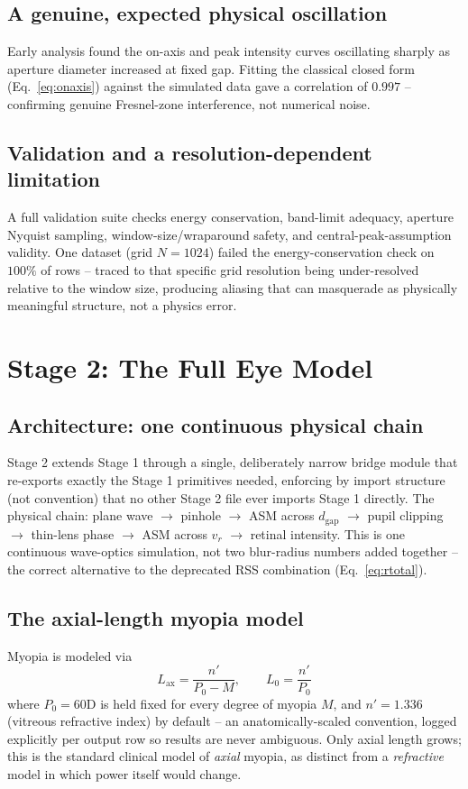 \documentclass[11pt]{report}
\newcommand{\dgap}{d_{\text{gap}}}
\newcommand{\vr}{v_r}
\begin{document}
\section{A genuine, expected physical oscillation}
\label{sec:oscillation}
Early analysis found the on-axis and peak intensity curves oscillating sharply as aperture diameter increased at fixed gap. Fitting the classical closed form (Eq.~\ref{eq:onaxis}) against the simulated data gave a correlation of $0.997$ -- confirming genuine Fresnel-zone interference, not numerical noise.

\section{Validation and a resolution-dependent limitation}
A full validation suite checks energy conservation, band-limit adequacy, aperture Nyquist sampling, window-size/wraparound safety, and central-peak-assumption validity. One dataset (grid $N=1024$) failed the energy-conservation check on $100\%$ of rows -- traced to that specific grid resolution being under-resolved relative to the window size, producing aliasing that can masquerade as physically meaningful structure, not a physics error.

\chapter{Stage 2: The Full Eye Model}
\label{ch:stage2}

\section{Architecture: one continuous physical chain}
Stage 2 extends Stage 1 through a single, deliberately narrow bridge module that re-exports exactly the Stage 1 primitives needed, enforcing by import structure (not convention) that no other Stage 2 file ever imports Stage 1 directly. The physical chain: plane wave $\to$ pinhole $\to$ ASM across $\dgap$ $\to$ pupil clipping $\to$ thin-lens phase $\to$ ASM across $\vr$ $\to$ retinal intensity. This is one continuous wave-optics simulation, not two blur-radius numbers added together -- the correct alternative to the deprecated RSS combination (Eq.~\ref{eq:rtotal}).

\section{The axial-length myopia model}
Myopia is modeled via
\begin{equation}
L_{\text{ax}} = \frac{n'}{P_0 - M}, \qquad L_0 = \frac{n'}{P_0}
\label{eq:axialmyopia}
\end{equation}
where $P_0=60$D is held fixed for every degree of myopia $M$, and $n'=1.336$ (vitreous refractive index) by default -- an anatomically-scaled convention, logged explicitly per output row so results are never ambiguous. Only axial length grows; this is the standard clinical model of \emph{axial} myopia, as distinct from a \emph{refractive} model in which power itself would change.
\end{document}
